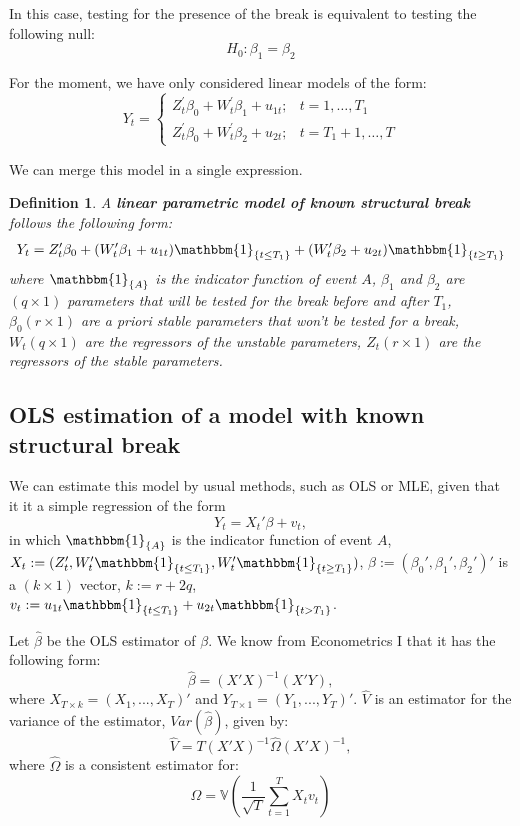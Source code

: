 \documentclass[11pt, a4paper]{report}
\theoremstyle{plain}
\theoremstyle{plain}
\newtheorem{defn}{Definition}[section]
\theoremstyle{remark}
\begin{document}
In this case, testing for the presence of the break is equivalent to testing the following null:
$$ H_0: \beta_1 = \beta_2 $$

For the moment, we have only considered linear models of the form:
$$Y_{t}=\left\{\begin{array}{ll}
{Z}_{t}^{\prime} {\beta}_{0}+{{W}}_{t}^{\prime} {\beta}_{1}+u_{1 t} ; & t=1, \ldots, T_{1} \\
{Z}_{t}^{\prime} {\beta}_{0}+{W}_{t}^{\prime} {\beta}_{2}+u_{2 t} ; & t=T_{1}+1, \ldots, T
\end{array}\right.$$

We can merge this model in a single expression.

\begin{defn} 
\label{def-structural-break}
A \textbf{linear parametric model of known structural break} follows the following form: 
$$
Y_t = Z_t'\beta_0 + (W_t'\beta_1 + u_{1t})\mathbbm{1}_{\{t \leq T_1\}} + (W_t'\beta_2 + u_{2t})\mathbbm{1}_{\{t \geq T_1\}} 
$$
where $\mathbbm{1}_{\{A\}}$ is the indicator function of event $A$, ${\beta}_{1}$ and ${\beta}_{2}$ are $(q \times 1)$ parameters that will be tested for the break before and after $T_1$, $\beta_0 (r \times 1)$ are a priori stable parameters that won't be tested for a break, $W_t (q \times 1)$ are the regressors of the unstable parameters, $Z_t (r \times 1)$ are the regressors of the stable parameters.
\end{defn} 

\subsection{OLS estimation of a model with known structural break}

We can estimate this model by usual methods, such as OLS or MLE, given that it it a simple regression of the form
$$Y_t = X_t'\beta + v_t,$$
in which $\mathbbm{1}_{\{A\}}$ is the indicator function of event $A$, $X_t := (Z_t', W_t'\mathbbm{1}_{\{t \leq T_1\}}, W_t'\mathbbm{1}_{\{t \geq T_1\}})$, $\beta := (\beta_0', \beta_1', \beta_2')'$ is a $(k \times 1)$ vector, $k := r + 2q$, $v_{t}:=u_{1 t} \mathbbm{1}_{\left\{t \leq T_{1}\right\}}+u_{2 t} \mathbbm{1}_{\left\{t>T_{1}\right\}}$.

Let $\hat{\beta}$ be the OLS estimator of $\beta$. We know from Econometrics I that it has the following form:
$$ \hat{\beta} = (X'X)^{-1} (X'Y), $$
where $X_{T \times k} = (X_1, ..., X_T)'$ and $Y_{T \times 1} = (Y_1, ..., Y_T)'$. $\hat{V}$ is an estimator for the variance of the estimator, $Var(\hat{\beta})$, given by:
$$ \hat{V} = T(X'X)^{-1} \hat{\Omega} (X'X)^{-1}, $$
where $\hat{\Omega}$ is a consistent estimator for:
$${\Omega}=\mathbb{V}\left(\frac{1}{\sqrt{T}} \sum_{t=1}^{T} {{X}}_{t} v_{t}\right)$$
\end{document}
